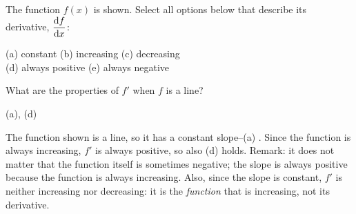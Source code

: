 %
%
\subsection*{\Conceptual}


\begin{question}
The function $f(x)$ is shown. Select all options below that describe its derivative, $\ds\diff{f}{x}$:
\begin{center}
(a) constant \qquad (b) increasing
\qquad (c) decreasing\\
(d) always positive
\qquad (e) always negative

\end{center}
\end{question}
\begin{hint} What are the properties of $f'$ when $f$ is a line?
\end{hint}
\begin{answer}(a), (d)
\end{answer}
\begin{solution} The function shown is a line, so it has a constant slope--(a) . Since the function is always increasing, $f'$ is always positive, so also (d) holds. Remark: it does not matter that the function itself is sometimes negative; the slope is always positive because the function is always increasing. Also, since the slope is constant, $f'$ is neither increasing nor decreasing: it is the \emph{function} that is increasing, not its derivative.
\end{solution}


